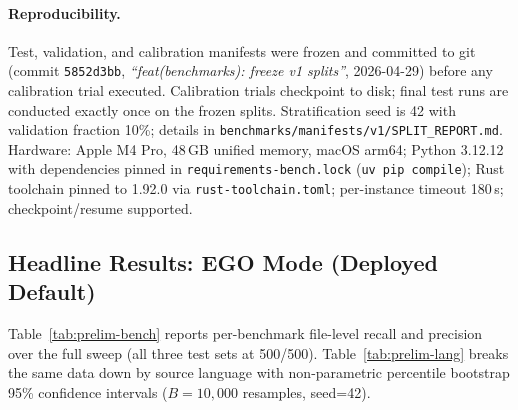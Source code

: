 \documentclass[11pt, a4paper]{article}
\begin{document}
\paragraph{Reproducibility.} Test, validation, and calibration manifests were frozen and committed to git (commit \texttt{5852d3bb}, \emph{``feat(benchmarks): freeze v1 splits''}, 2026-04-29) before any calibration trial executed. Calibration trials checkpoint to disk; final test runs are conducted exactly once on the frozen splits. Stratification seed is 42 with validation fraction 10\%; details in \texttt{benchmarks/manifests/v1/SPLIT\_REPORT.md}. Hardware: Apple M4 Pro, 48\,GB unified memory, macOS arm64; Python 3.12.12 with dependencies pinned in \texttt{requirements-bench.lock} (\texttt{uv pip compile}); Rust toolchain pinned to 1.92.0 via \texttt{rust-toolchain.toml}; per-instance timeout 180\,s; checkpoint/resume supported.

\subsection{Headline Results: EGO Mode (Deployed Default)}

Table~\ref{tab:prelim-bench} reports per-benchmark file-level recall and precision over the full sweep (all three test sets at 500/500). Table~\ref{tab:prelim-lang} breaks the same data down by source language with non-parametric percentile bootstrap 95\% confidence intervals ($B{=}10{,}000$ resamples, seed=42).

\begin{table}[h]
\centering
\small
\caption{Per-benchmark file-level metrics, scoring=EGO (deployed default), $B{=}8000$ tokens, with 95\% percentile bootstrap CIs ($B{=}10{,}000$ resamples, seed=42). Reported as \emph{intent-to-treat}: recall and precision are computed over all $n{=}500$ instances per test set, with \texttt{clone\_fail} and execution-error rows contributing recall $0$. The \texttt{ok\%} column reports the fraction of instances where the pipeline produced a non-error selection; an \emph{ok-only} sensitivity analysis (recall computed over the \texttt{ok\%} subset) is reported in the appendix and changes the headline by less than the CI half-width on every test set. Macro and micro averages coincide because each test set has $n{=}500$.}
\label{tab:prelim-bench}
\end{table}
\end{document}
